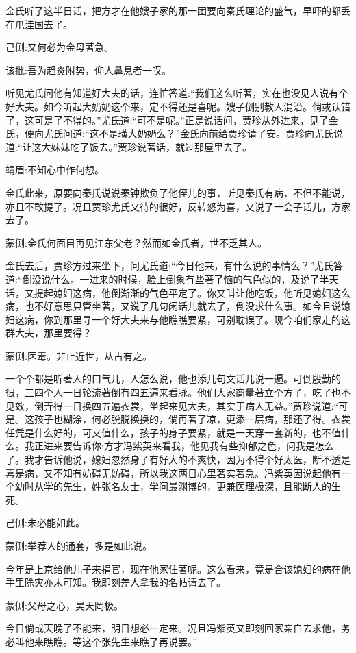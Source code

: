 \begin{parag}
    金氏听了这半日话，把方才在他嫂子家的那一团要向秦氏理论的盛气，早吓的都丢在爪洼国去了。\begin{note}己侧:又何必为金母著急。\end{note}\begin{note}该批:吾为趋炎附势，仰人鼻息者一叹。\end{note}听见尤氏问他有知道好大夫的话，连忙答道:“我们这么听著，实在也没见人说有个好大夫。如今听起大奶奶这个来，定不得还是喜呢。嫂子倒别教人混治。倘或认错了，这可是了不得的。”尤氏道:“可不是呢。”正是说话间，贾珍从外进来，见了金氏，便向尤氏问道:“这不是璜大奶奶么？”金氏向前给贾珍请了安。贾珍向尤氏说道:“让这大妹妹吃了饭去。”贾珍说著话，就过那屋里去了。\begin{note}靖眉:不知心中作何想。\end{note}金氏此来，原要向秦氏说说秦钟欺负了他侄儿的事，听见秦氏有病，不但不能说，亦且不敢提了。况且贾珍尤氏又待的很好，反转怒为喜，又说了一会子话儿，方家去了。\begin{note}蒙侧:金氏何面目再见江东父老？然而如金氏者，世不乏其人。\end{note}
\end{parag}


\begin{parag}
    金氏去后，贾珍方过来坐下，问尤氏道:“今日他来，有什么说的事情么？”尤氏答道:“倒没说什么。一进来的时候，脸上倒象有些著了恼的气色似的，及说了半天话，又提起媳妇这病，他倒渐渐的气色平定了。你又叫让他吃饭，他听见媳妇这么病，也不好意思只管坐著，又说了几句闲话儿就去了，倒没求什么事。如今且说媳妇这病，你到那里寻一个好大夫来与他瞧瞧要紧，可别耽误了。现今咱们家走的这群大夫，那里要得？\begin{note}蒙侧:医毒。非止近世，从古有之。\end{note}一个个都是听著人的口气儿，人怎么说，他也添几句文话儿说一遍。可倒殷勤的很，三四个人一日轮流著倒有四五遍来看脉。他们大家商量著立个方子，吃了也不见效，倒弄得一日换四五遍衣裳，坐起来见大夫，其实于病人无益。”贾珍说道:“可是。这孩子也糊涂，何必脱脱换换的，倘再著了凉，更添一层病，那还了得。衣裳任凭是什么好的，可又值什么，孩子的身子要紧，就是一天穿一套新的，也不值什么。我正进来要告诉你:方才冯紫英来看我，他见我有些抑郁之色，问我是怎么了。我才告诉他说，媳妇忽然身子有好大的不爽快，因为不得个好太医，断不透是喜是病，又不知有妨碍无妨碍，所以我这两日心里著实著急。冯紫英因说起他有一个幼时从学的先生，姓张名友士，学问最渊博的，更兼医理极深，且能断人的生死。\begin{note}己侧:未必能如此。\end{note}\begin{note}蒙侧:举荐人的通套，多是如此说。\end{note}今年是上京给他儿子来捐官，现在他家住著呢。这么看来，竟是合该媳妇的病在他手里除灾亦未可知。我即刻差人拿我的名帖请去了。\begin{note}蒙侧:父母之心，昊天罔极。\end{note}今日倘或天晚了不能来，明日想必一定来。况且冯紫英又即刻回家亲自去求他，务必叫他来瞧瞧。等这个张先生来瞧了再说罢。”
\end{parag}


